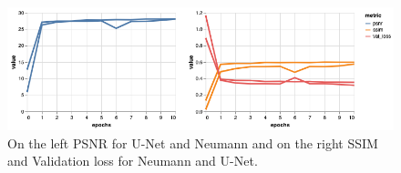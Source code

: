 \documentclass{article}
\begin{document}
\newpage
	\begin{figure}[H]
		\centering
		\captionsetup{justification=centering}
		\includegraphics[width=\textwidth]{unet_neumann}
		\caption{On the left PSNR for U-Net and Neumann and on the right SSIM and Validation loss for Neumann and U-Net.}
	\end{figure}
\end{document}

